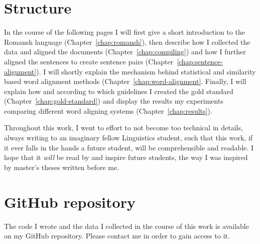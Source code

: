 \section{Structure}
In the course of the following pages I will first give a short introduction to the Romansh language (Chapter~\ref{chap:romansh}), then describe how I collected the data and aligned the documents (Chapter~\ref{chap:compiling}) and how I further aligned the sentences to create sentence pairs (Chapter~\ref{chap:sentence-alignment}). 
I will shortly explain the mechanism behind statistical and similarity based word alignment methods (Chapter~\ref{chap:word-alignment}. 
Finally, I will explain how and according to which guidelines I created the gold standard (Chapter~\ref{chap:gold-standard}) and display the results my experiments comparing different word aligning systems (Chapter~\ref{chap:results}).

Throughout this work, I went to effort to not become too technical in details, always writing to an imaginary fellow Linguistics student, such that this work, if it ever falls in the hands a future student, will be comprehensible and readable. 
I hope that it \emph{will} be read by and inspire future students, the way I was inspired by master's theses written before me.

\section{GitHub repository}
The code I wrote and the data I collected in the course of this work is available on my GitHub repository. 
Please contact me in order to gain access to it.



